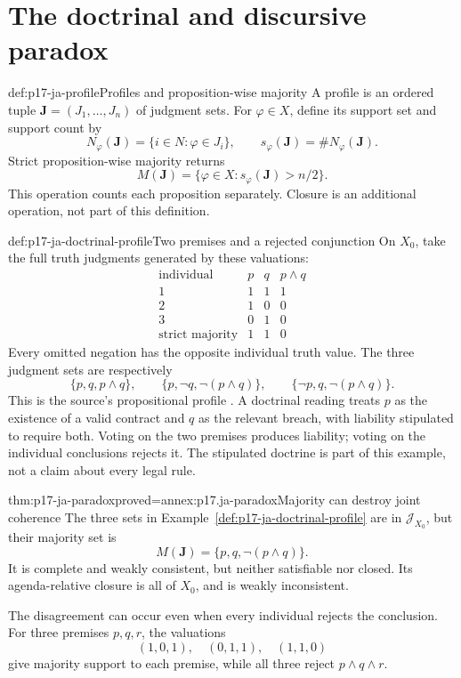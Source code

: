 \section{The doctrinal and discursive paradox}
\label{sec:p17-ja-paradox}

\begin{hbdefinition}{def:p17-ja-profile}{Profiles and proposition-wise majority}
A profile is an ordered tuple \(\mathbf J=(J_1,\ldots,J_n)\) of judgment sets.
For \(\varphi\in X\), define its support set and support count by
\[
 N_\varphi(\mathbf J)=\{i\in N:\varphi\in J_i\},
 \qquad s_\varphi(\mathbf J)=\#N_\varphi(\mathbf J).
\]
Strict proposition-wise majority returns
\[
 M(\mathbf J)=\{\varphi\in X:s_\varphi(\mathbf J)>n/2\}.
\]
This operation counts each proposition separately. Closure is an additional
operation, not part of this definition.
\end{hbdefinition}

\begin{hbexample}{def:p17-ja-doctrinal-profile}{Two premises and a rejected conjunction}
On \(X_0\), take the full truth judgments generated by these valuations:
\[
 \begin{array}{c|ccc}
 \text{individual}&p&q&p\land q\\ \hline
 1&1&1&1\\
 2&1&0&0\\
 3&0&1&0\\ \hline
 \text{strict majority}&1&1&0
 \end{array}
\]
Every omitted negation has the opposite individual truth value. The three
judgment sets are respectively
\[
 \{p,q,p\land q\},\qquad
 \{p,\neg q,\neg(p\land q)\},\qquad
 \{\neg p,q,\neg(p\land q)\}.
\]
This is the source's propositional profile
\cite[p.~12]{ListPettit2001JudgmentPreprint}. A doctrinal reading treats \(p\)
as the existence of a valid contract and \(q\) as the relevant breach, with
liability stipulated to require both. Voting on the two premises produces
liability; voting on the individual conclusions rejects it. The stipulated
doctrine is part of this example, not a claim about every legal rule.
\end{hbexample}

\begin{hbtheorem}{thm:p17-ja-paradox}{proved=annex:p17.ja-paradox}{Majority can destroy joint coherence}
The three sets in Example~\ref{def:p17-ja-doctrinal-profile} are in
\(\mathcal J_{X_0}\), but their majority set is
\[
 M(\mathbf J)=\{p,q,\neg(p\land q)\}.
\]
It is complete and weakly consistent, but neither satisfiable nor closed.
Its agenda-relative closure is all of \(X_0\), and is weakly inconsistent.

The disagreement can occur even when every individual rejects the conclusion.
For three premises \(p,q,r\), the valuations
\[
 (1,0,1),\quad(0,1,1),\quad(1,1,0)
\]
give majority support to each premise, while all three reject \(p\land q\land r\).
\end{hbtheorem}

